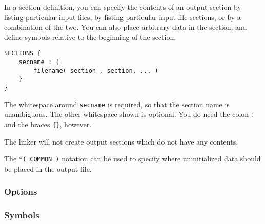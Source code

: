 In a section definition, you can specify the contents of an output section by listing particular input files, by listing particular input-file sections, or by a combination of the two. You can also place arbitrary data in the section, and define symbols relative to the beginning of the section.\cite{gnuldOutputSections}
\begin{verbatim}
SECTIONS {
    secname : {
        filename( section , section, ... )
    }
}
\end{verbatim}
The whitespace around \lstinline|secname| is required, so that the section name is unambiguous. The other whitespace shown is optional. You do need the colon \lstinline|:| and the braces \lstinline|{}|, however.\cite{gnuldOutputSections}

The linker will not create output sections which do not have any contents.\cite{gnuldOutputSections}

The \lstinline|*( COMMON )| notation can be used to specify where uninitialized data should be placed in the output file.\cite{gnuldOutputSections}

\subsubsection{Options}

\subsubsection{Symbols}